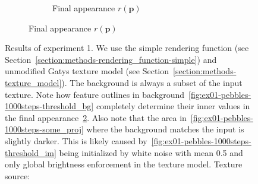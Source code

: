 \begin{figure}[]
\begin{subfigure}{\textwidth}
\begin{subfigure}{0.24\textwidth}
            \caption{Final appearance \(r(\bm{p})\)}
            \label{fig:ex01-pebbles-1000steps-threshold_proj}
        \end{subfigure}
    \end{subfigure}
    \caption{Results of experiment 1. We use the simple rendering function (see Section~\ref{section:methods-rendering_function-simple}) and unmodified Gatys texture model (see Section~\ref{section:methods-texture_model}). The background is always a subset of the input texture. Note how feature outlines in background~\ref{fig:ex01-pebbles-1000steps-threshold_bg} completely determine their inner values in the final appearance~\ref{fig:ex01-pebbles-1000steps-threshold_proj}. Also note that the area in~\ref{fig:ex01-pebbles-1000steps-some_proj} where the background matches the input is slightly darker. This is likely caused by~\ref{fig:ex01-pebbles-1000steps-threshold_im} being initialized by white noise with mean 0.5 and only global brightness enforcement in the texture model. Texture source: \citet{Gatys2015}}
    \label{fig:ex01-pebbles-1000steps}
\end{figure}

